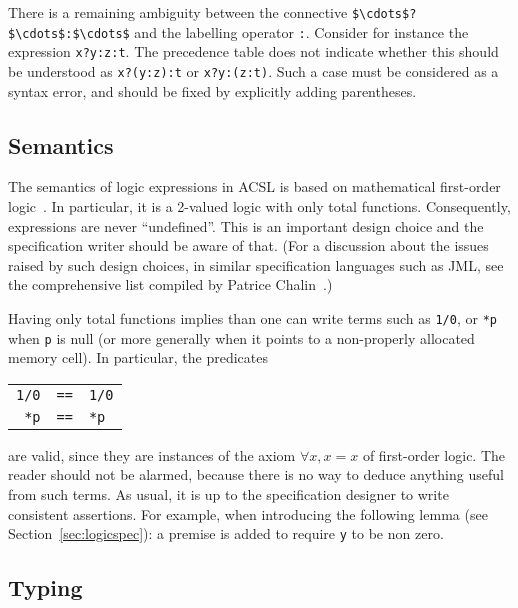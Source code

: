 There is a remaining ambiguity between the connective
\lstinline|$\cdots$?$\cdots$:$\cdots$| and the labelling operator
\lstinline|:|. Consider for instance the
expression \lstinline|x?y:z:t|. The precedence table does not indicate
whether this should be understood as \lstinline|x?(y:z):t| or
\lstinline|x?y:(z:t)|.
Such a case must be considered as a syntax error, and should be fixed
by explicitly adding parentheses.

\subsection{Semantics}
\label{sec:twovaluedlogic}

The semantics of logic expressions in ACSL is based on
mathematical first-order
logic~\cite{wikipedia-fo-logic}. In
particular, it is a 2-valued logic with only total functions. Consequently,
expressions are never ``undefined''.
This is an important design choice and the specification writer should
be aware of that. (For a discussion about the issues raised by such
design choices, in similar specification languages such as JML, see
the comprehensive list compiled by Patrice
Chalin~\cite{chalin05ftfjp,chalin07icse}.)

Having only total functions implies than one can write
terms such as \lstinline|1/0|, or \lstinline|*p| when \lstinline!p! is
null (or more
generally
when it points to a non-properly allocated memory cell). In
particular, the predicates
\begin{tabular}{rcl}
  \lstinline!1/0! &\lstinline|==|& \lstinline!1/0! \\\relax
  \lstinline!*p! &\lstinline|==|& \lstinline!*p!
\end{tabular}
are valid, since they are instances of the axiom $\forall x,
x=x$ of first-order logic. The reader should not be alarmed, because
there is no way to deduce anything useful from such terms.
As usual, it is up to the specification designer to write
consistent assertions. For example, when introducing the following lemma
(see Section~\ref{sec:logicspec}):
a premise is added to require \lstinline|y| to be non zero.


\subsection{Typing}\label{sec:typing}

